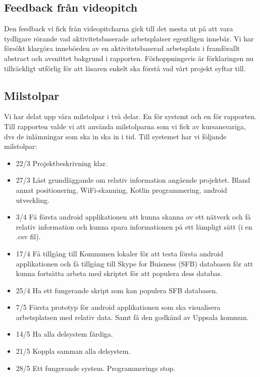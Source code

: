 \documentclass[swedish, a4paper,12pt]{article}
\begin{document}
\subsection{Feedback från videopitch}
Den feedback vi fick från videopitcharna gick till det mesta ut på att vara tydligare rörande vad aktivitetsbaserade arbetsplatser egentligen innebär.
Vi har försökt klargöra innebörden av en aktivitetsbaserad arbetsplats i framförallt abstract och avsnittet bakgrund i rapporten. Förhoppningsvis är förklaringen nu tillräckligt utförlig för att läsaren enkelt ska förstå vad vårt projekt syftar till.


\subsection{Milstolpar}
Vi har delat upp våra milstolpar i två delar. En för systemt och en för rapporten. Till rapporten valde vi att använda milstolparna som vi fick av kursansvariga, dvs de inlämningar som ska in ska in i tid. Till systemet har vi följande milstolpar:
\begin{itemize}
	\item 22/3 Projektbeskrivning klar.
	\item 27/3 Läst grundläggande om relativ information angående projektet. Bland annat positionering, WiFi-skanning, Kotlin programmering, android utveckling.
	\item 3/4 Få första android applikationen att kunna skanna av ett nätverk och få relativ information och kunna spara informationen på ett lämpligt sätt (i en .csv fil).
	\item 17/4 Få tillgång till Kommunen lokaler för att testa första android applikationen och få tillgång till Skype for Buisness (SFB) databasen för att kunna fortsätta arbeta med skriptet för att populera dess databas.
 	\item 25/4 Ha ett fungerande skript som kan populera  SFB databasen.
	\item 7/5 Första prototyp för android applikationen som ska visualisera arbetsplatsen med relativ data. Samt få den godkänd av Uppsala kommun.
	\item 14/5 Ha alla delsystem färdiga.
	\item 21/5 Koppla samman alla delsystem.
	\item 28/5 Ett fungerande system. Programmerings stop.
\end{itemize}
\fi
\end{document}
